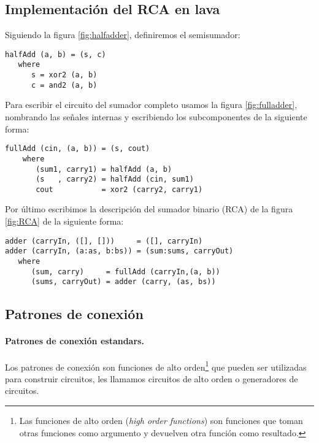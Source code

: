 \subsection{Implementación del RCA en lava}

\noindent Siguiendo la figura \ref{fig:halfadder}, definiremos el semisumador:
\begin{lstlisting}
halfAdd (a, b) = (s, c)
   where
      s = xor2 (a, b)
      c = and2 (a, b)
\end{lstlisting}
\noindent Para escribir el circuito del sumador completo usamos la figura \ref{fig:fulladder}, nombrando las señales internas y escribiendo los subcomponentes de la siguiente forma:
\begin{lstlisting}
fullAdd (cin, (a, b)) = (s, cout)
    where
       (sum1, carry1) = halfAdd (a, b)
       (s   , carry2) = halfAdd (cin, sum1)
       cout           = xor2 (carry2, carry1)
\end{lstlisting}

Por último escribimos la descripción del sumador binario (RCA) de la figura \ref{fig:RCA} de la siguiente forma:

\begin{lstlisting}
adder (carryIn, ([], []))     = ([], carryIn)
adder (carryIn, (a:as, b:bs)) = (sum:sums, carryOut)
   where
      (sum, carry)     = fullAdd (carryIn,(a, b))
      (sums, carryOut) = adder (carry, (as, bs))
\end{lstlisting}

\subsection{Patrones de conexión}
\paragraph{Patrones de conexión estandars.} Los patrones de conexión son funciones de alto orden\footnote{Las funciones de alto orden (\emph{high order functions}) son funciones que toman otras funciones como argumento y devuelven otra función como resultado.} que pueden ser utilizadas para construir circuitos, les llamamos circuitos de alto orden o generadores de circuitos.

